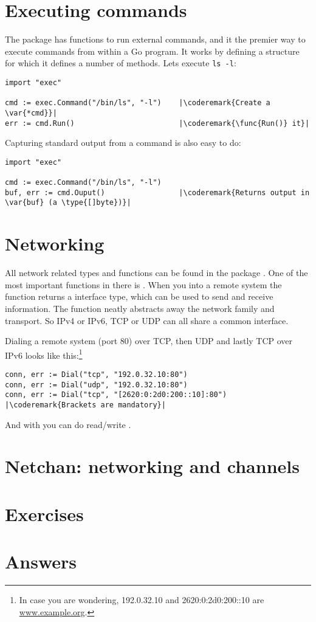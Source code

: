 \section{Executing commands}
The  package has functions to run external commands, and it the premier way to
execute commands from within a Go program. It works by defining a  structure for which it
defines a number of methods.
Lets execute \verb|ls -l|:
\begin{lstlisting}
import "exec"

cmd := exec.Command("/bin/ls", "-l")    |\coderemark{Create a \var{*cmd}}|
err := cmd.Run()                        |\coderemark{\func{Run()} it}|
\end{lstlisting}
Capturing standard output from a command is also easy to do:
\begin{lstlisting}
import "exec"

cmd := exec.Command("/bin/ls", "-l")
buf, err := cmd.Ouput()                 |\coderemark{Returns output in \var{buf} (a \type{[]byte})}|
\end{lstlisting}

\section{Networking}
All network related types and functions can be found in the package . One of the
most important functions in there is . When you 
into a remote system the function returns a  interface type, which can be used
to send and receive information. The function  neatly abstracts away the network
family and transport. So IPv4 or IPv6, TCP or UDP can all share a common interface. 

Dialing a remote system (port 80) over TCP, then UDP and lastly TCP over IPv6 looks
like this:\footnote{In case
you are wondering, 192.0.32.10 and 2620:0:2d0:200::10 are \url{www.example.org}.}
\begin{lstlisting}
conn, err := Dial("tcp", "192.0.32.10:80")
conn, err := Dial("udp", "192.0.32.10:80")
conn, err := Dial("tcp", "[2620:0:2d0:200::10]:80") |\coderemark{Brackets are mandatory}|
\end{lstlisting}

And with  you can do read/write .


\section{Netchan: networking and channels}

\section{Exercises}










\cleardoublepage
\section{Answers}
\shipoutAnswer

